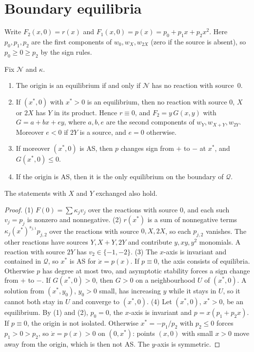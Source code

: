 \documentclass[11pt,a4paper]{report}
\newcommand{\Q}{\mathcal{Q}}
\newcommand{\Net}{\mathcal{N}}
\begin{document}
\section{Boundary equilibria}

Write \(F_2(x,0)=r(x)\) and \(F_1(x,0)=p(x)=p_0+p_1x+p_2x^2\). Here \(p_0,p_1,p_2\) are the first components of
\(w_0,w_X,w_{2X}\) (zero if the source is absent), so \(p_0\ge0\ge p_2\) by the sign rules.

\begin{lemma}\label{lem:axis}
Fix \(\Net\) and \(\kappa\).
\begin{enumerate}
\item The origin is an equilibrium if and only if \(\Net\) has no reaction with source~\(0\).
\item If \((x^*,0)\) with \(x^*>0\) is an equilibrium, then no reaction with source \(0\), \(X\) or \(2X\) has \(Y\) in
its product. Hence \(r\equiv0\), and \(F_2=y\,G(x,y)\) with \(G=a+bx+ey\), where \(a,b,e\) are the second
components of \(w_Y,w_{X+Y},w_{2Y}\). Moreover \(e<0\) if \(2Y\) is a source, and \(e=0\) otherwise.
\item If moreover \((x^*,0)\) is AS, then \(p\) changes sign from \(+\) to \(-\) at \(x^*\), and \(G(x^*,0)\le0\).
\item If the origin is AS, then it is the only equilibrium on the boundary of \(\Q\).
\end{enumerate}
The statements with \(X\) and \(Y\) exchanged also hold.
\end{lemma}

\begin{proof}
(1) \(F(0)=\sum\kappa_jv_j\) over the reactions with source \(0\), and each such \(v_j=p_j\) is nonzero and
nonnegative. (2) \(r(x^*)\) is a sum of nonnegative terms \(\kappa_j(x^*)^{s_{j,1}}p_{j,2}\) over the reactions with
source \(0,X,2X\), so each \(p_{j,2}\) vanishes. The other reactions have sources \(Y,X+Y,2Y\) and contribute
\(y,xy,y^2\) monomials. A reaction with source \(2Y\) has \(v_2\in\{-1,-2\}\). (3) The \(x\)-axis is invariant and
contained in \(\Q\), so \(x^*\) is AS for \(\dot x=p(x)\). If \(p\equiv0\), the axis consists of equilibria.
Otherwise \(p\) has degree at most two, and asymptotic stability forces a sign change from \(+\) to \(-\). If
\(G(x^*,0)>0\), then \(G>0\) on a neighbourhood \(U\) of \((x^*,0)\). A solution from \((x^*,y_0)\), \(y_0>0\) small,
has increasing \(y\) while it stays in \(U\), so it cannot both stay in \(U\) and converge to \((x^*,0)\).
(4) Let \((x^*,0)\), \(x^*>0\), be an equilibrium. By (1) and (2), \(p_0=0\), the \(x\)-axis is invariant and
\(p=x(p_1+p_2x)\). If \(p\equiv0\), the origin is not isolated. Otherwise \(x^*=-p_1/p_2\) with \(p_2\le0\) forces
\(p_1>0>p_2\), so \(\dot x=p(x)>0\) on \((0,x^*)\): points \((x,0)\) with small \(x>0\) move away from the origin,
which is then not AS. The \(y\)-axis is symmetric.
\end{proof}
\end{document}
